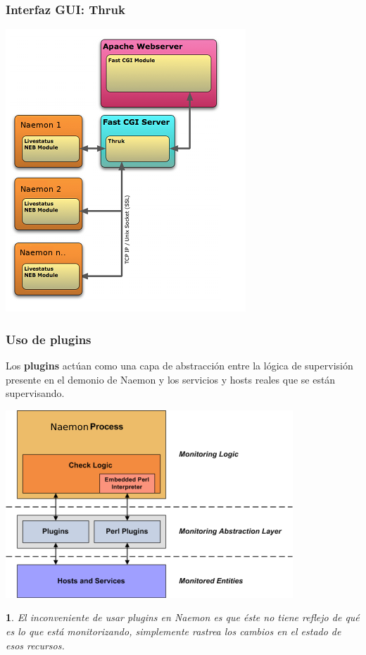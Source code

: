 \documentclass{beamer}
\theoremstyle{plain}
\theoremstyle{definition}
\theoremstyle{plain}
\newtheorem{prop}[thm]{}
\theoremstyle{definition}
\theoremstyle{remark}
\theoremstyle{definition}
\begin{document}
\begin{frame}
	\frametitle{Interfaz GUI: Thruk}
	\centering
	\includegraphics[scale=0.5]{imagenes/arquitecturaThruk.png}
	
\end{frame}
\begin{frame}
	\frametitle{Uso de plugins}
	\begin{block}
		
		Los \textbf{plugins} actúan como una capa de abstracción entre la lógica de supervisión presente en el demonio de Naemon y los servicios y hosts reales que se están supervisando.
	\end{block}
	\centering
	\includegraphics[scale=0.3]{imagenes/plugins.png}
	
	\begin{prop}
		El inconveniente de usar plugins en Naemon es que éste no tiene reflejo de qué es lo que está monitorizando, simplemente rastrea los cambios en el estado de esos recursos.
	\end{prop}
	
\end{frame}
\end{document}

